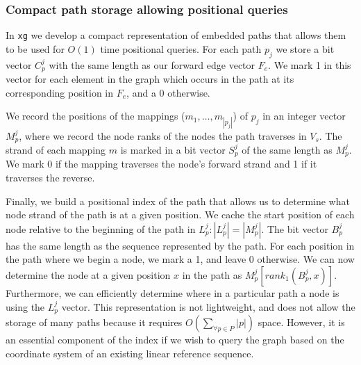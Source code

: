 \documentclass[12pt]{article}
\begin{document}
\subsubsection{Compact path storage allowing positional queries}

In {\tt xg} we develop a compact representation of embedded paths that allows them to be used for $O(1)$ time positional queries.
For each path $p_j$ we store a bit vector $C_p^j$ with the same length as our forward edge vector $F_e$.
We mark 1 in this vector for each element in the graph which occurs in the path at its corresponding position in $F_e$, and a 0 otherwise.

We record the positions of the mappings ($m_1, \ldots, m_{|p_j|}$) of $p_j$ in an integer vector $M_p^j$, where we record the node ranks of the nodes the path traverses in $V_s$.
The strand of each mapping $m$ is marked in a bit vector $S_p^j$ of the same length as $M_p^j$.
We mark 0 if the mapping traverses the node's forward strand and 1 if it traverses the reverse.

Finally, we build a positional index of the path that allows us to determine what node strand of the path is at a given position.
We cache the start position of each node relative to the beginning of the path in $L_p^j : |L_p^j| = |M_p^j|$.
The bit vector $B_p^j$ has the same length as the sequence represented by the path.
For each position in the path where we begin a node, we mark a 1, and leave 0 otherwise.
We can now determine the node at a given position $x$ in the path as $M_p^j[rank_1(B_p^j, x)]$.
Furthermore, we can efficiently determine where in a particular path a node is using the $L_p^j$ vector.
This representation is not lightweight, and does not allow the storage of many paths because it requires $O(\sum_{\forall p \in P}{|p|})$ space.
However, it is an essential component of the index if we wish to query the graph based on the coordinate system of an existing linear reference sequence.
\end{document}
